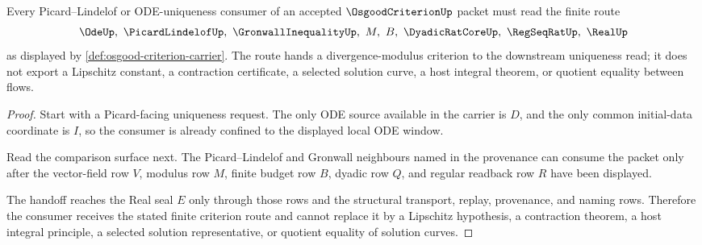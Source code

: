 \begin{theorem}
\label{thm:osgood-criterion-picard-handoff}
Every Picard--Lindelof or ODE-uniqueness consumer of an accepted $\OsgoodCriterionUp$ packet must read the finite route
$$
\OdeUp,\ \PicardLindelofUp,\ \GronwallInequalityUp,\ M,\ B,\ \DyadicRatCoreUp,\ \RegSeqRatUp,\ \RealUp
$$
as displayed by \autoref{def:osgood-criterion-carrier}. The route hands a divergence-modulus criterion to the downstream uniqueness read; it does not export a Lipschitz constant, a contraction certificate, a selected solution curve, a host integral theorem, or quotient equality between flows.
\end{theorem}
\begin{proof}
Start with a Picard-facing uniqueness request. The only ODE source available in the carrier is $D$, and the only common initial-data coordinate is $I$, so the consumer is already confined to the displayed local ODE window.

Read the comparison surface next. The Picard--Lindelof and Gronwall neighbours named in the provenance can consume the packet only after the vector-field row $V$, modulus row $M$, finite budget row $B$, dyadic row $Q$, and regular readback row $R$ have been displayed.

The handoff reaches the Real seal $E$ only through those rows and the structural transport, replay, provenance, and naming rows. Therefore the consumer receives the stated finite criterion route and cannot replace it by a Lipschitz hypothesis, a contraction theorem, a host integral principle, a selected solution representative, or quotient equality of solution curves.
\end{proof}





